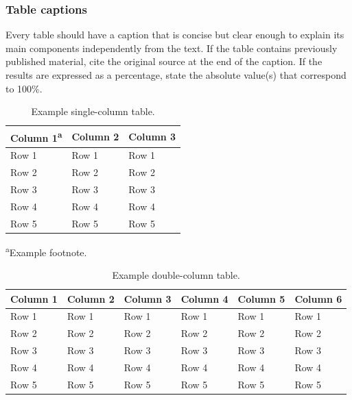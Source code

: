 \documentclass[twocolumn,twoside]{base/ajstd}
\begin{document}
\subsubsection{Table captions}

Every table should have a caption that is concise but clear enough to explain its main components independently from the text. If the table contains previously published material, cite the original source at the end of the caption. If the results are expressed as a percentage, state the absolute value(s) that correspond to 100\%.

\begin{table}[b]
  	\centering\footnotesize\sffamily
  	\caption{Example single-column table.}
  	\begin{tableminipage}{\linewidth}
    	\begin{tabularx} {\linewidth}{XXX}
			\toprule
            Column 1\textsuperscript{a} & Column 2 & Column 3  \\            
	    	\midrule
            Row 1 & Row 1 & Row 1 \\
            Row 2 & Row 2 & Row 2 \\
            Row 3 & Row 3 & Row 3 \\
            Row 4 & Row 4 & Row 4 \\
            Row 5 & Row 5 & Row 5 \\
            \bottomrule
    	\end{tabularx}
        \label{tab:1}
        \vskip0pt
        \textsuperscript{a}Example footnote.
  	\end{tableminipage}
\end{table}

\begin{table}[t]
  	\centering\footnotesize\sffamily
  	\caption{Example double-column table.}
  	\begin{tableminipage}{\linewidth}
    	\begin{tabularx} {\linewidth}{XXXXXX}
			\toprule
            Column 1 & Column 2 & Column 3 & Column 4 & Column 5 & Column 6 \\            
	    	\midrule
            Row 1 & Row 1 & Row 1 & Row 1 & Row 1 & Row 1 \\
            Row 2 & Row 2 & Row 2 & Row 2 & Row 2 & Row 2 \\
            Row 3 & Row 3 & Row 3 & Row 3 & Row 3 & Row 3 \\
            Row 4 & Row 4 & Row 4 & Row 4 & Row 4 & Row 4 \\
            Row 5 & Row 5 & Row 5 & Row 5 & Row 5 & Row 5 \\
            \bottomrule
    	\end{tabularx}
        \label{tab:2}
  	\end{tableminipage}
\end{table}
\end{document}

